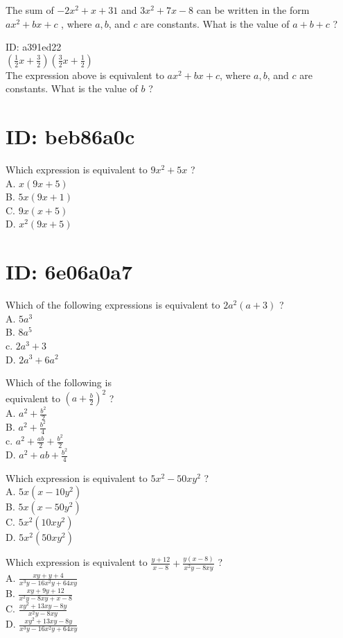 The sum of $-2 x^{2}+x+31$ and $3 x^{2}+7 x-8$ can be written in the form $a x^{2}+b x+c$ , where $a, b$, and $c$ are constants. What is the value of $a+b+c$ ?

ID: a391ed22\\
$\left(\frac{1}{2} x+\frac{3}{2}\right)\left(\frac{3}{2} x+\frac{1}{2}\right)$\\
The expression above is equivalent to $a x^{2}+b x+c$, where $a, b$, and $c$ are constants. What is the value of $b$ ?

\section*{ID: beb86a0c}
Which expression is equivalent to $9 x^{2}+5 x$ ?\\
A. $x(9 x+5)$\\
B. $5 x(9 x+1)$\\
C. $9 x(x+5)$\\
D. $x^{2}(9 x+5)$

\section*{ID: 6e06a0a7}
Which of the following expressions is equivalent to $2 a^{2}(a+3)$ ?\\
A. $5 a^{3}$\\
B. $8 a^{5}$\\
c. $2 a^{3}+3$\\
D. $2 a^{3}+6 a^{2}$

Which of the following is\\
equivalent to $\left(a+\frac{b}{2}\right)^{2}$ ?\\
A. $a^{2}+\frac{b^{2}}{2}$\\
B. $a^{2}+\frac{b^{2}}{4}$\\
c. $a^{2}+\frac{a b}{2}+\frac{b^{2}}{2}$\\
D. $a^{2}+a b+\frac{b^{2}}{4}$

Which expression is equivalent to $5 x^{2}-50 x y^{2}$ ?\\
A. $5 x\left(x-10 y^{2}\right)$\\
B. $5 x\left(x-50 y^{2}\right)$\\
C. $5 x^{2}\left(10 x y^{2}\right)$\\
D. $5 x^{2}\left(50 x y^{2}\right)$

Which expression is equivalent to $\frac{y+12}{x-8}+\frac{y(x-8)}{x^{2} y-8 x y}$ ?\\
A. $\frac{x y+y+4}{x^{3} y-16 x^{2} y+64 x y}$\\
B. $\frac{x y+9 y+12}{x^{2} y-8 x y+x-8}$\\
C. $\frac{x y^{2}+13 x y-8 y}{x^{2} y-8 x y}$\\
D. $\frac{x y^{2}+13 x y-8 y}{x^{3} y-16 x^{2} y+64 x y}$

